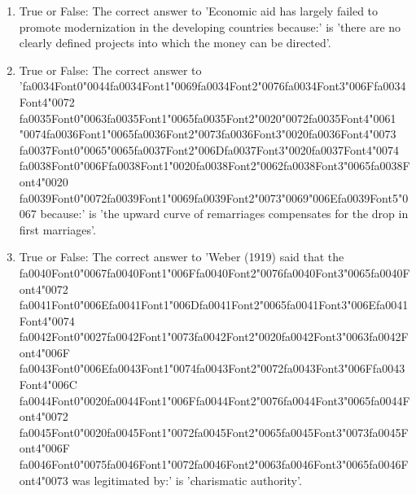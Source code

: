 \documentclass[12pt]{article}
\begin{document}
\begin{enumerate}[label=\arabic*.]
\item True or False: The correct answer to 'Economic aid has largely failed to promote modernization in the developing countries because:' is 'there are no clearly defined projects into which the money can be directed'.
\item True or False: The correct answer to '{\csname fa0034Font0\endcsname\char"0044}{\csname fa0034Font1\endcsname\char"0069}{\csname fa0034Font2\endcsname\char"0076}{\csname fa0034Font3\endcsname\char"006F}{\csname fa0034Font4\endcsname\char"0072} {\csname fa0035Font0\endcsname\char"0063}{\csname fa0035Font1\endcsname\char"0065}{\csname fa0035Font2\endcsname\char"0020}{\char"0072}{\csname fa0035Font4\endcsname\char"0061} {\char"0074}{\csname fa0036Font1\endcsname\char"0065}{\csname fa0036Font2\endcsname\char"0073}{\csname fa0036Font3\endcsname\char"0020}{\csname fa0036Font4\endcsname\char"0073} {\csname fa0037Font0\endcsname\char"0065}{\char"0065}{\csname fa0037Font2\endcsname\char"006D}{\csname fa0037Font3\endcsname\char"0020}{\csname fa0037Font4\endcsname\char"0074} {\csname fa0038Font0\endcsname\char"006F}{\csname fa0038Font1\endcsname\char"0020}{\csname fa0038Font2\endcsname\char"0062}{\csname fa0038Font3\endcsname\char"0065}{\csname fa0038Font4\endcsname\char"0020} {\csname fa0039Font0\endcsname\char"0072}{\csname fa0039Font1\endcsname\char"0069}{\csname fa0039Font2\endcsname\char"0073}{\char"0069}{\char"006E}{\csname fa0039Font5\endcsname\char"0067} because:' is 'the upward curve of remarriages compensates for the drop in first marriages'.
\item True or False: The correct answer to 'Weber (1919) said that the {\csname fa0040Font0\endcsname\char"0067}{\csname fa0040Font1\endcsname\char"006F}{\csname fa0040Font2\endcsname\char"0076}{\csname fa0040Font3\endcsname\char"0065}{\csname fa0040Font4\endcsname\char"0072} {\csname fa0041Font0\endcsname\char"006E}{\csname fa0041Font1\endcsname\char"006D}{\csname fa0041Font2\endcsname\char"0065}{\csname fa0041Font3\endcsname\char"006E}{\csname fa0041Font4\endcsname\char"0074} {\csname fa0042Font0\endcsname\char"0027}{\csname fa0042Font1\endcsname\char"0073}{\csname fa0042Font2\endcsname\char"0020}{\csname fa0042Font3\endcsname\char"0063}{\csname fa0042Font4\endcsname\char"006F} {\csname fa0043Font0\endcsname\char"006E}{\csname fa0043Font1\endcsname\char"0074}{\csname fa0043Font2\endcsname\char"0072}{\csname fa0043Font3\endcsname\char"006F}{\csname fa0043Font4\endcsname\char"006C} {\csname fa0044Font0\endcsname\char"0020}{\csname fa0044Font1\endcsname\char"006F}{\csname fa0044Font2\endcsname\char"0076}{\csname fa0044Font3\endcsname\char"0065}{\csname fa0044Font4\endcsname\char"0072} {\csname fa0045Font0\endcsname\char"0020}{\csname fa0045Font1\endcsname\char"0072}{\csname fa0045Font2\endcsname\char"0065}{\csname fa0045Font3\endcsname\char"0073}{\csname fa0045Font4\endcsname\char"006F} {\csname fa0046Font0\endcsname\char"0075}{\csname fa0046Font1\endcsname\char"0072}{\csname fa0046Font2\endcsname\char"0063}{\csname fa0046Font3\endcsname\char"0065}{\csname fa0046Font4\endcsname\char"0073} was legitimated by:' is 'charismatic authority'.

\end{enumerate}
\end{document}
